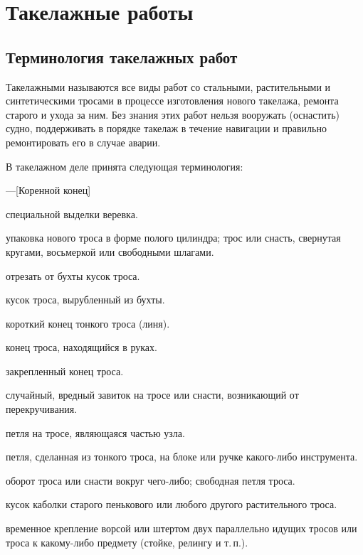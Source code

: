 \documentclass[a4paper, 12pt, twoside, final]{scrbook}
\begin{document}
%
%

\chapter{Такелажные работы}

\section{Терминология такелажных работ}

Такелажными называются все виды работ со стальными, растительными и синтетическими тросами в процессе изготовления нового такелажа, ремонта старого и ухода за ним. Без знания этих работ нельзя вооружать (оснастить) судно, поддерживать в порядке такелаж в течение навигации и правильно ремонтировать его в случае аварии.

В такелажном деле принята следующая терминология:

\begin{desclist}{\bfseries}{ \hfill---}[Коренной конец]
\item[Трос] специальной выделки веревка.
\item[Бухта] упаковка нового троса в форме полого цилиндра; трос или снасть, свернутая кругами, восьмеркой или свободными шлагами.
\item[Вырубить] отрезать от бухты кусок троса.
\item[Конец] кусок троса, вырубленный из бухты.
\item[Штерт, кончик] короткий конец тонкого троса (линя).
\item[Ходовой конец] конец троса, находящийся в руках.
\item[Коренной конец] закрепленный конец троса.
\item[Калышка] случайный, вредный завиток на тросе или снасти, возникающий от перекручивания.
\item[Колышка] петля на тросе, являющаяся частью узла.
\item[Стропка] петля, сделанная из тонкого троса, на блоке или ручке какого-либо инструмента.
\item[Шлаг] оборот троса или снасти вокруг чего-либо; свободная петля троса.
\item[Ворса] кусок каболки старого пенькового или любого другого растительного троса.
\item[Схватка] временное крепление ворсой или штертом двух параллельно идущих тросов или троса к какому-либо предмету (стойке, релингу и т.\,п.).
\end{desclist}
\end{document}
